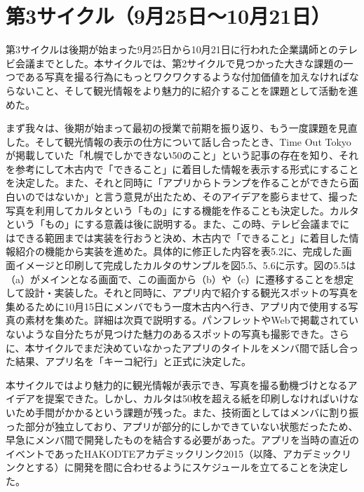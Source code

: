 \section{第3サイクル（9月25日～10月21日）}
第3サイクルは後期が始まった9月25日から10月21日に行われた企業講師とのテレビ会議までとした。本サイクルでは、第2サイクルで見つかった大きな課題の一つである写真を撮る行為にもっとワクワクするような付加価値を加えなければならないこと、そして観光情報をより魅力的に紹介することを課題として活動を進めた。
\par まず我々は、後期が始まって最初の授業で前期を振り返り、もう一度課題を見直した。そして観光情報の表示の仕方について話し合ったとき、Time Out Tokyoが掲載していた「札幌でしかできない50のこと」という記事の存在を知り、それを参考にして木古内で「できること」に着目した情報を表示する形式にすることを決定した。また、それと同時に「アプリからトランプを作ることができたら面白いのではないか」と言う意見が出たため、そのアイデアを膨らませて、撮った写真を利用してカルタという「もの」にする機能を作ることも決定した。カルタという「もの」にする意義は後に説明する。また、この時、テレビ会議までにはできる範囲までは実装を行おうと決め、木古内で「できること」に着目した情報紹介の機能から実装を進めた。具体的に修正した内容を表5.2に、完成した画面イメージと印刷して完成したカルタのサンプルを図5.5、5.6に示す。図の5.5は（a）がメインとなる画面で、この画面から（b）や（c）に遷移することを想定して設計・実装した。それと同時に、アプリ内で紹介する観光スポットの写真を集めるために10月15日にメンバでもう一度木古内へ行き、アプリ内で使用する写真の素材を集めた。詳細は次頁で説明する。パンフレットやWebで掲載されていないような自分たちが見つけた魅力のあるスポットの写真も撮影できた。さらに、本サイクルでまだ決めていなかったアプリのタイトルをメンバ間で話し合った結果、アプリ名を「キーコ紀行」と正式に決定した。
\par 本サイクルではより魅力的に観光情報が表示でき、写真を撮る動機づけとなるアイデアを提案できた。しかし、カルタは50枚を超える紙を印刷しなければいけないため手間がかかるという課題が残った。また、技術面としてはメンバに割り振った部分が独立しており、アプリが部分的にしかできていない状態だったため、早急にメンバ間で開発したものを結合する必要があった。アプリを当時の直近のイベントであったHAKODTEアカデミックリンク2015（以降、アカデミックリンクとする）に開発を間に合わせるようにスケジュールを立てることを決定した。\newpage


